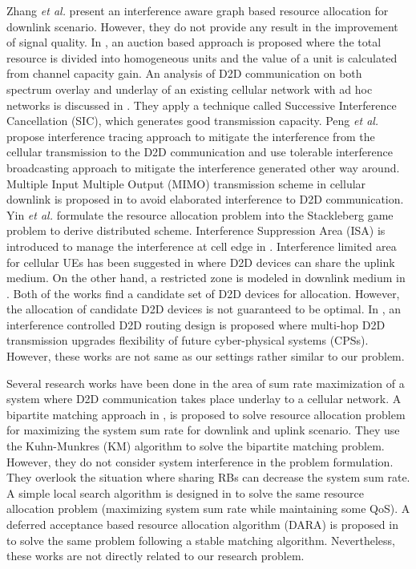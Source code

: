 \documentclass{ieeeaccess}
\begin{document}
\smallskip
 
Zhang  \textit{et al.} \cite{rzhang} present an interference aware graph based resource allocation for downlink scenario.  However, they do not provide any result in the improvement of signal quality. In \cite{xu}, an auction based approach is proposed where the total resource is divided into homogeneous units and the value of a unit is calculated from channel capacity gain. An analysis of D2D communication on both spectrum overlay and underlay of an existing cellular network with ad hoc networks is discussed in \cite{huang}. They apply a technique called Successive Interference Cancellation (SIC), which generates good transmission capacity. Peng \textit{et al.} \cite{peng2009interference} propose interference tracing approach to mitigate the interference from the cellular transmission to the D2D communication and use tolerable interference broadcasting approach to mitigate the interference generated other way around. Multiple Input Multiple Output (MIMO) transmission scheme in cellular downlink is proposed in \cite{janis2009interference} to avoid elaborated interference to D2D communication. Yin \textit{et al.} \cite{yin2013distributed} formulate the resource allocation problem into the Stackleberg game problem to derive distributed scheme. Interference Suppression Area (ISA) is introduced to manage the interference at cell edge in \cite{guo2014interference}. Interference limited area for cellular UEs has been suggested in \cite{min2011capacity} where D2D devices can share the uplink medium. On the other hand, a restricted zone is modeled in downlink medium in \cite{cai_cap}. Both of the works find a candidate set of D2D devices for allocation. However, the allocation of candidate D2D devices is not guaranteed to be optimal. In \cite{du}, an interference controlled D2D routing design is proposed where multi-hop D2D transmission upgrades flexibility of future cyber-physical systems (CPSs). However, these works are not same as our settings rather similar to our problem.

\smallskip
 
Several research works have been done in the area of sum rate maximization of a system where D2D communication takes place underlay to a cellular network. A bipartite matching approach in \cite{jiang}, is proposed to solve resource allocation problem for maximizing the system sum rate for downlink and uplink scenario. They use the Kuhn-Munkres (KM) algorithm to solve the bipartite matching problem. However, they do not consider system interference in the problem formulation. They overlook the situation where sharing RBs can decrease the system sum rate. A simple local search algorithm is designed in \cite{lora} to solve the same resource allocation problem (maximizing system sum rate while maintaining some QoS). A deferred acceptance based resource allocation algorithm (DARA) is proposed in \cite{dara} to solve the same problem following a stable matching algorithm. Nevertheless, these works are not directly related to our research problem.
\end{document}
